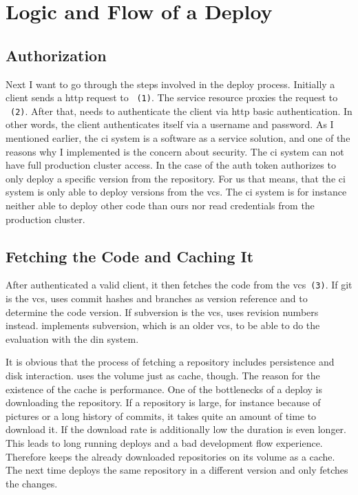 \section{Logic and Flow of a Deploy}

\subsection{Authorization}

Next I want to go through the steps involved in the deploy process. Initially a client
sends a http request to \deployer~\texttt{(1)}. The service resource proxies the request
to \deployer~\texttt{(2)}. After that, \deployer needs to authenticate the client via http
basic authentication. In other words, the client authenticates itself via a username and
password. As I mentioned earlier, the \gls{ci} system is a software as a service solution,
and one of the reasons why I implemented \deployer is the concern about security. The
\gls{ci} system can not have full production cluster access. In the case of \deployer the
auth token authorizes to only deploy a specific version from the repository. For us that
means, that the \gls{ci} system is only able to deploy versions from the \gls{vcs}. The
\gls{ci} system is for instance neither able to deploy other code than ours nor read
credentials from the production cluster.

\subsection{Fetching the Code and Caching It}
\label{sec:cache}

After \deployer authenticated a valid client, it then fetches the code from the
\gls{vcs}~\texttt{(3)}. If git is the \gls{vcs}, \deployer uses commit hashes and branches
as version reference and to determine the code version. If subversion is the \gls{vcs},
\deployer uses revision numbers instead. \deployer implements subversion, which is an older
\gls{vcs}, to be able to do the evaluation with the \gls{din} system.

It is obvious that the process of fetching a repository includes persistence and disk
interaction. \deployer uses the volume just as cache, though. The reason for the existence
of the cache is performance. One of the bottlenecks of a deploy is downloading the
repository. If a repository is large, for instance because of pictures or a long history
of commits, it takes quite an amount of time to download it. If the download rate is
additionally low the duration is even longer. This leads to long running deploys and a bad
development flow experience. Therefore \deployer keeps the already downloaded repositories
on its volume as a cache. The next time \deployer deploys the same repository in a
different version and \deployer only fetches the changes.

